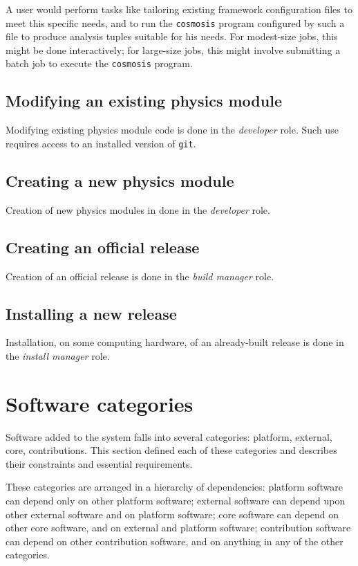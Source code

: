 \documentclass[draftmode,draftwater]{memarticle}
\newcommand{\prog}[1]%
  {\texttt{#1}}
\begin{document}
A user would perform tasks like tailoring existing framework
configuration files to meet this specific needs, and to run the
\prog{cosmosis} program configured by such a file to produce analysis
tuples suitable for his needs. For modest-size jobs, this might be done
interactively; for large-size jobs, this might involve submitting a
batch job to execute the \prog{cosmosis} program.

\subsection{Modifying an existing physics module}

Modifying existing physics module code is done in the \emph{developer}
role. Such use requires access to an installed version of \prog{git}.

\subsection{Creating a new physics module}

Creation of new physics modules in done in the \emph{developer} role.

\subsection{Creating an official release}

Creation of an official release is done in the \emph{build manager}
role.

\subsection{Installing a new release}

Installation, on some computing hardware, of an already-built release is
done in the \emph{install manager} role.

\section{Software categories}

Software added to the system falls into several categories: platform,
external, core, contributions. This section defined each of these
categories and describes their constraints and essential requirements.

These categories are arranged in a hierarchy of dependencies: platform
software can depend only on other platform software; external software
can depend upon other external software and on platform software; core
software can depend on other core software, and on external and platform
software; contribution software can depend on other contribution
software, and on anything in any of the other categories.
\end{document}
